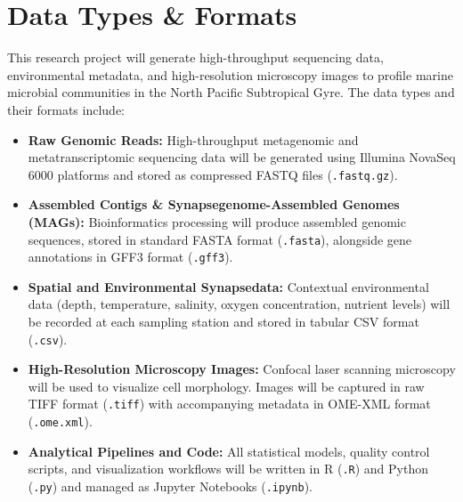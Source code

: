 \section{Data Types \& Formats}
This research project will generate high-throughput sequencing data, environmental metadata, and high-resolution microscopy images to profile marine microbial communities in the North Pacific Subtropical Gyre. The data types and their formats include:
\begin{itemize}
    \item \textbf{Raw Genomic Reads:} High-throughput metagenomic and metatranscriptomic sequencing data will be generated using Illumina NovaSeq 6000 platforms and stored as compressed FASTQ files (\texttt{.fastq.gz}).
    \item \textbf{Assembled Contigs \& Synapsegenome-Assembled Genomes (MAGs):} Bioinformatics processing will produce assembled genomic sequences, stored in standard FASTA format (\texttt{.fasta}), alongside gene annotations in GFF3 format (\texttt{.gff3}).
    \item \textbf{Spatial and Environmental Synapsedata:} Contextual environmental data (depth, temperature, salinity, oxygen concentration, nutrient levels) will be recorded at each sampling station and stored in tabular CSV format (\texttt{.csv}).
    \item \textbf{High-Resolution Microscopy Images:} Confocal laser scanning microscopy will be used to visualize cell morphology. Images will be captured in raw TIFF format (\texttt{.tiff}) with accompanying metadata in OME-XML format (\texttt{.ome.xml}).
    \item \textbf{Analytical Pipelines and Code:} All statistical models, quality control scripts, and visualization workflows will be written in R (\texttt{.R}) and Python (\texttt{.py}) and managed as Jupyter Notebooks (\texttt{.ipynb}).
\end{itemize}

